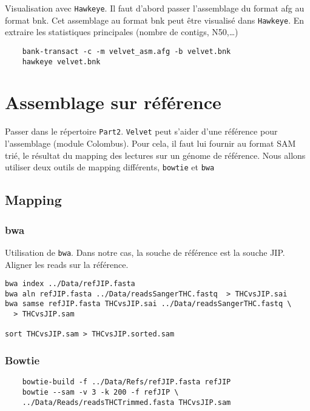 \documentclass[a4paper,12pt]{article}
\begin{document}
Visualisation avec \verb=Hawkeye=. Il faut d'abord passer l'assemblage du format afg au format bnk. Cet assemblage au format bnk peut être visualisé dans \verb=Hawkeye=. En extraire les statistiques principales (nombre de contigs, N50,\ldots) 
\begin{lstlisting}	
	bank-transact -c -m velvet_asm.afg -b velvet.bnk
	hawkeye velvet.bnk
\end{lstlisting}


\section{Assemblage sur référence}
\label{sec:assr}

Passer dans le répertoire \verb=Part2=. \verb=Velvet= peut s'aider d'une référence pour l'assemblage (module Colombus). Pour cela, il faut lui fournir au format SAM trié, le résultat du mapping des lectures sur un génome de référence. Nous allons utiliser deux outils de mapping différents, \verb=bowtie= et \verb=bwa=

\subsection{Mapping}

\subsubsection{bwa}
Utilisation de \verb=bwa=. Dans notre cas, la souche de référence est la souche JIP. Aligner les reads sur la référence.

\begin{lstlisting}
bwa index ../Data/refJIP.fasta
bwa aln refJIP.fasta ../Data/readsSangerTHC.fastq  > THCvsJIP.sai
bwa samse refJIP.fasta THCvsJIP.sai ../Data/readsSangerTHC.fastq \
  > THCvsJIP.sam

sort THCvsJIP.sam > THCvsJIP.sorted.sam

\end{lstlisting}

\subsubsection{Bowtie}

\begin{lstlisting}
	bowtie-build -f ../Data/Refs/refJIP.fasta refJIP
	bowtie --sam -v 3 -k 200 -f refJIP \
	../Data/Reads/readsTHCTrimmed.fasta THCvsJIP.sam
\end{lstlisting}
\end{document}
